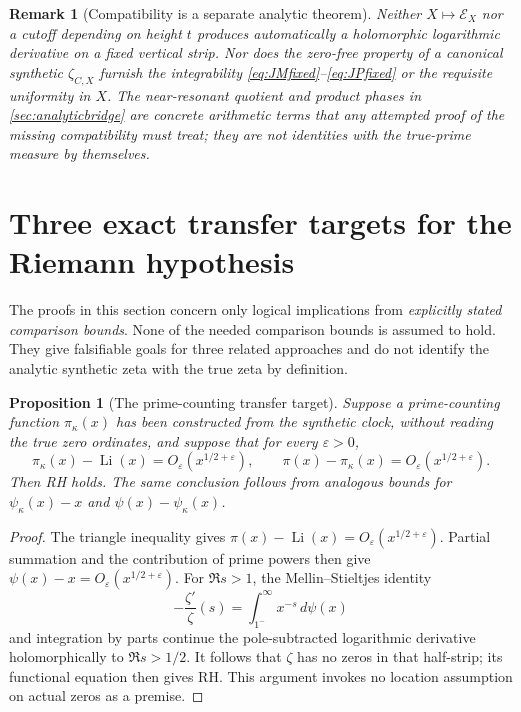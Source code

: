 \documentclass[11pt,reqno]{amsart}
\numberwithin{equation}{section}
\newtheorem{proposition}[theorem]{Proposition}
\newtheorem{remark}[theorem]{Remark}
\begin{document}
\begin{remark}[Compatibility is a separate analytic theorem]
Neither $X\mapsto \mathscr E_X$ nor a cutoff depending on height $t$
produces automatically a holomorphic logarithmic derivative on a
fixed vertical strip.  Nor does the zero-free property of a
canonical synthetic $\zeta_{C,X}$ furnish the integrability
\eqref{eq:JMfixed}--\eqref{eq:JPfixed} or the requisite
uniformity in $X$.  The near-resonant quotient and product
phases in \cref{sec:analyticbridge} are concrete arithmetic
terms that any attempted proof of the missing compatibility
must treat; they are not identities with the true-prime
measure by themselves.
\end{remark}

\section{Three exact transfer targets for the Riemann hypothesis}
\label{sec:RHtransfers}
The proofs in this section concern only logical implications from
\emph{explicitly stated comparison bounds}. None of the needed
comparison bounds is assumed to hold. They give falsifiable goals
for three related approaches and do not identify the analytic
synthetic zeta with the true zeta by definition.

\begin{proposition}[The prime-counting transfer target]
\label{prop:piRHtarget}
Suppose a prime-counting function $\pi_\kappa(x)$ has been
constructed from the synthetic clock, \emph{without reading the
true zero ordinates}, and suppose that for every $\varepsilon>0$,
\[
\pi_\kappa(x)-\operatorname{Li}(x)=O_\varepsilon(x^{1/2+\varepsilon}),
\qquad
\pi(x)-\pi_\kappa(x)=O_\varepsilon(x^{1/2+\varepsilon}).
\]
Then RH holds. The same conclusion follows from analogous
bounds for $\psi_\kappa(x)-x$ and $\psi(x)-\psi_\kappa(x)$.
\end{proposition}
\begin{proof}
The triangle inequality gives
$\pi(x)-\operatorname{Li}(x)=O_\varepsilon(x^{1/2+\varepsilon})$.
Partial summation and the contribution of prime powers then give
$\psi(x)-x=O_\varepsilon(x^{1/2+\varepsilon})$.
For $\Re s>1$, the Mellin--Stieltjes identity
\[
-\frac{\zeta'}\zeta(s)=\int_{1^-}^\infty x^{-s}\,d\psi(x)
\]
and integration by parts continue the pole-subtracted logarithmic
derivative holomorphically to $\Re s>1/2$.
It follows that $\zeta$ has no zeros in that half-strip;
its functional equation then gives RH. This argument invokes no
location assumption on actual zeros as a premise.
\end{proof}
\end{document}
